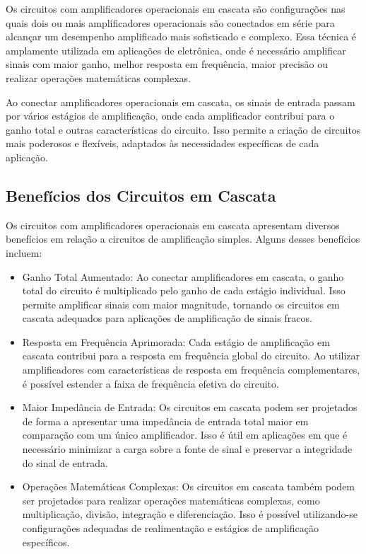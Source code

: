 \documentclass[12pt,twoside, a4paper, twocolumn]{article}
\begin{document}
Os circuitos com amplificadores operacionais em cascata são configurações nas quais dois ou mais amplificadores operacionais são conectados em série para alcançar um desempenho amplificado mais sofisticado e complexo. Essa técnica é amplamente utilizada em aplicações de eletrônica, onde é necessário amplificar sinais com maior ganho, melhor resposta em frequência, maior precisão ou realizar operações matemáticas complexas.


Ao conectar amplificadores operacionais em cascata, os sinais de entrada passam por vários estágios de amplificação, onde cada amplificador contribui para o ganho total e outras características do circuito. Isso permite a criação de circuitos mais poderosos e flexíveis, adaptados às necessidades específicas de cada aplicação.


\subsection{Benefícios dos Circuitos em Cascata}


Os circuitos com amplificadores operacionais em cascata apresentam diversos benefícios em relação a circuitos de amplificação simples. Alguns desses benefícios incluem:


\begin{itemize}
    \item Ganho Total Aumentado: Ao conectar amplificadores em cascata, o ganho total do circuito é multiplicado pelo ganho de cada estágio individual. Isso permite amplificar sinais com maior magnitude, tornando os circuitos em cascata adequados para aplicações de amplificação de sinais fracos.
    \item Resposta em Frequência Aprimorada: Cada estágio de amplificação em cascata contribui para a resposta em frequência global do circuito. Ao utilizar amplificadores com características de resposta em frequência complementares, é possível estender a faixa de frequência efetiva do circuito.
    \item Maior Impedância de Entrada: Os circuitos em cascata podem ser projetados de forma a apresentar uma impedância de entrada total maior em comparação com um único amplificador. Isso é útil em aplicações em que é necessário minimizar a carga sobre a fonte de sinal e preservar a integridade do sinal de entrada.
    \item Operações Matemáticas Complexas: Os circuitos em cascata também podem ser projetados para realizar operações matemáticas complexas, como multiplicação, divisão, integração e diferenciação. Isso é possível utilizando-se configurações adequadas de realimentação e estágios de amplificação específicos.
\end{itemize}
\end{document}
